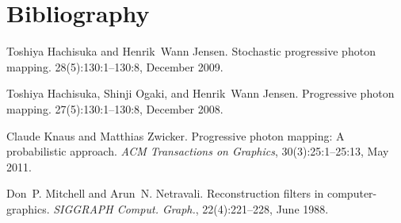 \chapter{Bibliography}
\hypertarget{citelist}{}\label{citelist}

\begin{DoxyDescription}
\item[\label{citelist_CITEREF_Hachisuka:2009:Stochastic}%
\Hypertarget{citelist_CITEREF_Hachisuka:2009:Stochastic}%
\mbox{[}1\mbox{]}]Toshiya Hachisuka and Henrik~Wann Jensen. Stochastic progressive photon mapping. 28(5)\+:130\+:1--130\+:8, December 2009. 


\item[\label{citelist_CITEREF_Hachisuka:2008:Progressive}%
\Hypertarget{citelist_CITEREF_Hachisuka:2008:Progressive}%
\mbox{[}2\mbox{]}]Toshiya Hachisuka, Shinji Ogaki, and Henrik~Wann Jensen. Progressive photon mapping. 27(5)\+:130\+:1--130\+:8, December 2008. 


\item[\label{citelist_CITEREF_Knaus:2011:Progressive}%
\Hypertarget{citelist_CITEREF_Knaus:2011:Progressive}%
\mbox{[}3\mbox{]}]Claude Knaus and Matthias Zwicker. Progressive photon mapping\+: A probabilistic approach. {\itshape ACM Transactions on Graphics}, 30(3)\+:25\+:1--25\+:13, May 2011. 


\item[\label{citelist_CITEREF_Mitchell:1988:Reconstruction}%
\Hypertarget{citelist_CITEREF_Mitchell:1988:Reconstruction}%
\mbox{[}4\mbox{]}]Don~P. Mitchell and Arun~N. Netravali. Reconstruction filters in computer-\/graphics. {\itshape SIGGRAPH Comput. Graph.}, 22(4)\+:221--228, June 1988. 


\end{DoxyDescription}